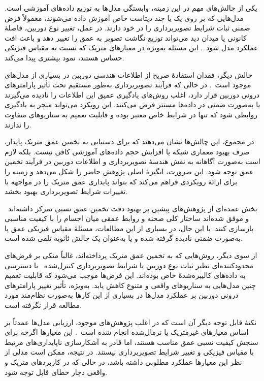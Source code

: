 یکی از چالش‌های مهم در این زمینه، وابستگی مدل‌ها به توزیع داده‌های آموزشی است. مدل‌هایی که بر روی یک یا چند دیتاست خاص آموزش داده می‌شوند، معمولاً فرض ضمنی ثبات شرایط تصویربرداری را در خود دارند. در عمل، تغییر نوع دوربین، فاصلهٔ کانونی یا میدان دید می‌تواند توزیع نگاشت تصویر به عمق را تغییر دهد
و باعث افت عملکرد مدل شود~\cite{Facil2019CAMConvs,Yin2023Metric3D}. این مسئله به‌ویژه در معیارهای متریک که نسبت به مقیاس فیزیکی حساس هستند، نمود بیشتری پیدا می‌کند.

چالش دیگر، فقدان استفادهٔ صریح از اطلاعات هندسی دوربین در بسیاری از مدل‌های موجود است~\cite{Facil2019CAMConvs,Yin2023Metric3D}. در حالی که فرآیند تصویربرداری به‌طور مستقیم تحت تأثیر پارامترهای درونی دوربین قرار دارد، اغلب روش‌های یادگیری عمیق این اطلاعات را نادیده می‌گیرند یا به‌صورت ضمنی در داده‌ها مستتر فرض می‌کنند. این رویکرد می‌تواند منجر به یادگیری روابطی شود که تنها در شرایط خاص معتبر بوده و قابلیت تعمیم به سناریوهای متفاوت را ندارند.

در مجموع، این چالش‌ها نشان می‌دهند که برای دستیابی به تخمین عمق متریک پایدار، صرف بهبود معماری شبکه یا افزایش حجم داده‌های آموزشی کافی نیست. بلکه لازم است به‌صورت آگاهانه به نقش هندسهٔ تصویربرداری و اطلاعات دوربین در فرآیند تخمین عمق توجه شود. این ضرورت، انگیزهٔ اصلی پژوهش حاضر را شکل می‌دهد و زمینه را برای ارائهٔ رویکردی فراهم می‌کند که بتواند پایداری عمق متریک را در مواجهه با تغییرات شرایط تصویربرداری بهبود بخشد.


بخش عمده‌ای از پژوهش‌های پیشین بر بهبود دقت تخمین عمق نسبی تمرکز داشته‌اند~\cite{Eigen2014Depth,Godard2017Unsupervised} و موفق شده‌اند ساختار کلی صحنه و روابط عمقی میان اجسام را با کیفیت مناسبی بازسازی کنند. با این حال، در بسیاری از این مطالعات، مسئلهٔ مقیاس فیزیکی عمق یا به‌صورت ضمنی نادیده گرفته شده و یا به‌عنوان یک چالش ثانویه تلقی شده است.

از سوی دیگر، روش‌هایی که به تخمین عمق متریک پرداخته‌اند،
غالباً متکی بر فرض‌های محدودکننده‌ای نظیر ثبات نوع دوربین یا شرایط تصویربرداری کنترل‌شده~\cite{Ranftl2021DPT,Bhat2023ZoeDepth} یا دسترسی به داده‌های کالیبره‌شدهٔ خاص بوده‌اند. این فرض‌ها موجب می‌شود که قابلیت تعمیم چنین مدل‌هایی به سناریوهای واقعی و متنوع کاهش یابد. به‌ویژه، تأثیر تغییر پارامترهای درونی دوربین بر عملکرد مدل‌ها در بسیاری از این کارها به‌صورت نظام‌مند مورد مطالعه قرار نگرفته است.

نکتهٔ قابل توجه دیگر آن است که در اغلب پژوهش‌های موجود، 
ارزیابی مدل‌ها عمدتاً بر اساس معیارهای غیرمتریک یا نرمال‌شده انجام شده است~\cite{Eigen2015Predicting}. این معیارها اگرچه برای سنجش کیفیت نسبی عمق مناسب هستند، اما قادر به آشکارسازی ناپایداری‌های مرتبط با مقیاس فیزیکی و تغییر شرایط تصویربرداری نیستند. در نتیجه، ممکن است مدلی از نظر این معیارها عملکرد مطلوبی داشته باشد، در حالی که در کاربردهای متریک و واقعی دچار خطای قابل توجه شود.

